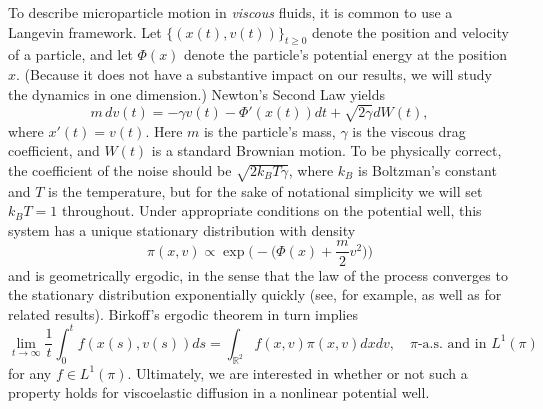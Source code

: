 \documentclass[11pt]{amsart}
\theoremstyle{definition}
\newcommand{\rbb}{\mathbb{R}}
\theoremstyle{definition}
\theoremstyle{plain}
\numberwithin{equation}{section}
\begin{document}
To describe microparticle motion in \emph{viscous} fluids, it is common to use a Langevin framework. Let $\{(x(t),v(t))\}_{t \geq 0}$ denote the position and velocity of a particle, and let $\Phi(x)$ denote the particle's potential energy at the position $x$. (Because it does not have a substantive impact on our results, we will study the dynamics in one dimension.) Newton's Second Law yields \cite{pavliotis2014stochastic}
\begin{equation} \label{eq:langevin}
	m \, d v(t) = -\gamma v(t) - \Phi'(x(t)) dt + \sqrt{2\gamma} d W(t),
\end{equation}
where $x'(t) = v(t)$. Here $m$ is the particle's mass, $\gamma$ is the viscous drag coefficient, and $W(t)$ is a standard Brownian motion. To be physically correct, the coefficient of the noise should be $\sqrt{2 k_B T \gamma}$, where $k_B$ is Boltzman's constant and $T$ is the temperature, but for the sake of notational simplicity we will set $k_B T = 1$ throughout.  Under appropriate conditions on the potential well, this system has a unique stationary distribution with density 
\begin{equation} \label{eqn:marginal-x-v}
	\pi(x,v) \propto \exp\Big(\!\!- \big(\Phi(x) + \frac{m}{2} v^2\big)\Big)
\end{equation}
and is geometrically ergodic, in the sense that the law of the process converges to the stationary distribution exponentially quickly (see, for example, \cite{mattingly2002ergodicity, cooke2017geometric, herzog2017ergodicity, pavliotis2014stochastic} as well as \cite{conrad2010construction, grothaus2015hypocoercivity} for related results). Birkoff's ergodic theorem in turn implies
\begin{equation} \label{eqn:ergodic-theorem}
	\lim_{t \to \infty}\frac{1}{t} \int_0^t f(x(s), v(s)) ds = \int_{\rbb^2} f(x,v) \pi(x,v) dx dv, \quad \pi\text{-a.s. and in }L^1(\pi)
\end{equation}
for any $f \in L^1(\pi)$.  Ultimately, we are interested in whether or not such a property holds for viscoelastic diffusion in a nonlinear potential well. 
\end{document}
